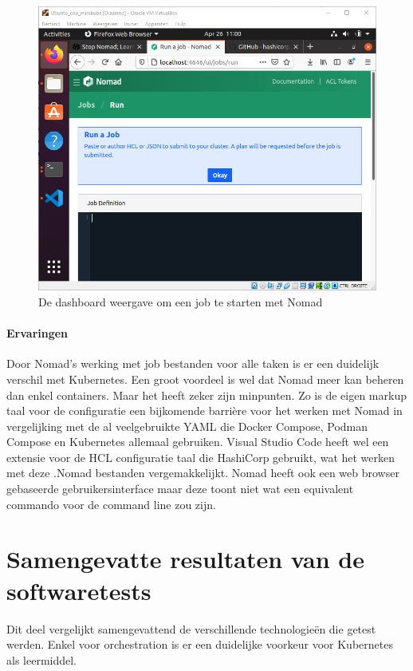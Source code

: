 \begin{figure}[h]
    \includegraphics[width=\linewidth]{img/nomdaddash.png}
    \caption[De Nomad dashboard]{De dashboard weergave om een job te starten met Nomad}
    \label{fig:nomdaddash}
    \centering
\end{figure}


\paragraph{Ervaringen}
Door Nomad’s werking met job bestanden voor alle taken is er een duidelijk verschil met Kubernetes. Een groot voordeel is wel dat Nomad meer kan beheren dan enkel containers. Maar het heeft zeker zijn minpunten. Zo is de eigen markup taal voor de configuratie een bijkomende barrière voor het werken met Nomad in vergelijking met de al veelgebruikte YAML die Docker Compose, Podman Compose en Kubernetes allemaal gebruiken. Visual Studio Code heeft wel een extensie voor de HCL configuratie taal die HashiCorp gebruikt, wat het werken met deze .Nomad bestanden vergemakkelijkt. Nomad heeft ook een web browser gebaseerde gebruikersinterface maar deze toont niet wat een equivalent commando voor de command line zou zijn.

\section{Samengevatte resultaten van de softwaretests}
Dit deel vergelijkt samengevattend de verschillende technologieën die getest werden. Enkel voor orchestration is er een duidelijke voorkeur voor Kubernetes als leermiddel.

